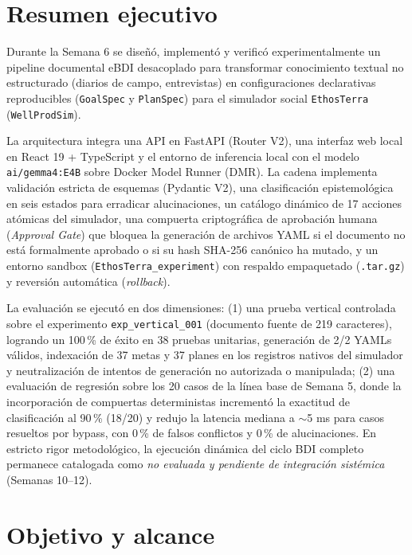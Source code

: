 \documentclass[11pt,a4paper]{article}
\begin{document}
\section{Resumen ejecutivo}
Durante la Semana 6 se diseñó, implementó y verificó experimentalmente un pipeline documental eBDI desacoplado para transformar conocimiento textual no estructurado (diarios de campo, entrevistas) en configuraciones declarativas reproducibles (\texttt{GoalSpec} y \texttt{PlanSpec}) para el simulador social \texttt{EthosTerra} (\texttt{WellProdSim}).

La arquitectura integra una API en FastAPI (Router V2), una interfaz web local en React 19 + TypeScript y el entorno de inferencia local con el modelo \texttt{ai/gemma4:E4B} sobre Docker Model Runner (DMR). La cadena implementa validación estricta de esquemas (Pydantic V2), una clasificación epistemológica en seis estados para erradicar alucinaciones, un catálogo dinámico de 17 acciones atómicas del simulador, una compuerta criptográfica de aprobación humana (\textit{Approval Gate}) que bloquea la generación de archivos YAML si el documento no está formalmente aprobado o si su hash SHA-256 canónico ha mutado, y un entorno sandbox (\texttt{EthosTerra\_experiment}) con respaldo empaquetado (\texttt{.tar.gz}) y reversión automática (\textit{rollback}).

La evaluación se ejecutó en dos dimensiones: (1) una prueba vertical controlada sobre el experimento \texttt{exp\_vertical\_001} (documento fuente de 219 caracteres), logrando un 100\,\% de éxito en 38 pruebas unitarias, generación de 2/2 YAMLs válidos, indexación de 37 metas y 37 planes en los registros nativos del simulador y neutralización de intentos de generación no autorizada o manipulada; (2) una evaluación de regresión sobre los 20 casos de la línea base de Semana 5, donde la incorporación de compuertas deterministas incrementó la exactitud de clasificación al 90\,\% (18/20) y redujo la latencia mediana a $\sim$5 ms para casos resueltos por bypass, con 0\,\% de falsos conflictos y 0\,\% de alucinaciones. En estricto rigor metodológico, la ejecución dinámica del ciclo BDI completo permanece catalogada como \textit{no evaluada y pendiente de integración sistémica} (Semanas 10--12).

\section{Objetivo y alcance}
\end{document}
